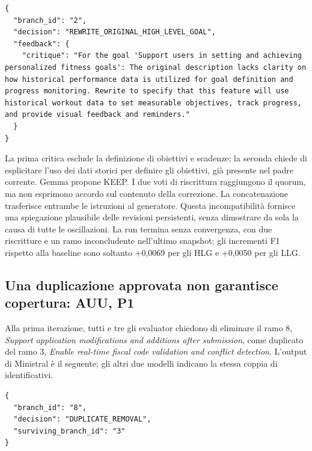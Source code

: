 \begin{lstlisting}[style=llmjson,caption={Decisione reale di Granite sullo stesso ramo e snapshot.},label={lst:results-fitness-granite}]
{
  "branch_id": "2",
  "decision": "REWRITE_ORIGINAL_HIGH_LEVEL_GOAL",
  "feedback": {
    "critique": "For the goal 'Support users in setting and achieving personalized fitness goals': The original description lacks clarity on how historical performance data is utilized for goal definition and progress monitoring. Rewrite to specify that this feature will use historical workout data to set measurable objectives, track progress, and provide visual feedback and reminders."
  }
}
\end{lstlisting}


La prima critica esclude la definizione di obiettivi e scadenze;
la seconda chiede di esplicitare l'uso dei dati storici per definire
gli obiettivi, gi\`a presente nel padre corrente. Gemma propone KEEP.
I due voti di riscrittura raggiungono il quorum, ma non esprimono
accordo sul contenuto della correzione. La concatenazione trasferisce
entrambe le istruzioni al generatore. Questa incompatibilit\`a
fornisce una spiegazione plausibile delle revisioni persistenti,
senza dimostrare da sola la causa di tutte le oscillazioni.
La run termina senza convergenza, con due riscritture e un ramo
inconcludente nell'ultimo snapshot; gli incrementi F1 rispetto alla
baseline sono soltanto +0,0069 per gli HLG e +0,0050 per gli LLG.

\subsection{Una duplicazione approvata non garantisce copertura: AUU, P1}
Alla prima iterazione, tutti e tre gli evaluator chiedono di eliminare
il ramo 8, \emph{Support application modifications and additions after
submission}, come duplicato del ramo 3,
\emph{Enable real-time fiscal code validation and conflict detection}.
L'output di Ministral \`e il seguente; gli altri due modelli indicano
la stessa coppia di identificativi.

\begin{lstlisting}[style=llmjson,caption={Decisione reale di Ministral: AUU, P1, iterazione 1, ramo 8; voto unanime dei tre evaluator.},label={lst:results-auu-duplicate}]
{
  "branch_id": "8",
  "decision": "DUPLICATE_REMOVAL",
  "surviving_branch_id": "3"
}
\end{lstlisting}


